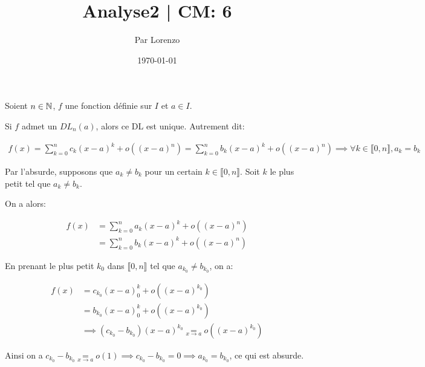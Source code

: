 \documentclass[a4paper, 12pt]{article}
\title{Analyse2 | CM: 6}
\author{Par Lorenzo}
\date{\today}
\begin{document}
\maketitle

\begin{proposition}
    Soient $n \in \mathbb{N}$, $f$ une fonction définie sur $I$ et $a \in I$.

    Si $f$ admet un $DL_n(a)$, alors ce DL est unique. Autrement dit:

    \begin{align*}
        f(x) = \sum_{k=0}^{n} c_k(x-a)^k + o((x-a)^n) = \sum_{k=0}^{n} b_k(x-a)^k + o((x-a)^n) \implies \forall k \in \llbracket 0, n \rrbracket, a_k = b_k
    \end{align*}
\end{proposition}

\begin{demonstration}
    Par l'absurde, supposons que $a_k \neq b_k$ pour un certain $k \in \llbracket 0, n \rrbracket$. Soit $k$ le plus petit tel que $a_k \neq b_k$.

    On a alors:

    \begin{align*}
        f(x) &= \sum_{k=0}^{n} a_k(x-a)^k + o((x-a)^n) \\
        &= \sum_{k=0}^{n} b_k(x-a)^k + o((x-a)^n)
    \end{align*}

    En prenant le plus petit $k_0$ dans $\llbracket 0, n \rrbracket$ tel que $a_{k_0} \neq b_{k_0}$, on a:

    \begin{align*}
        f(x) &= c_{k_0}(x-a)^k_0 + o((x-a)^{k_0}) \\
        &= b_{k_0}(x-a)^k_0 + o((x-a)^{k_0}) \\
        &\implies (c_{k_0} - b_{k_0})(x - a)^{k_0} \underset{x \to a}{=} o((x - a)^{k_0})
    \end{align*}

    Ainsi on a $c_{k_0} - b_{k_0} \underset{x \to a}{=} o(1) \implies c_{k_0} - b_{k_0} = 0 \implies a_{k_0} = b_{k_0}$, ce qui est absurde.

\end{demonstration}

\begin{proposition}
\end{proposition}
\end{document}

